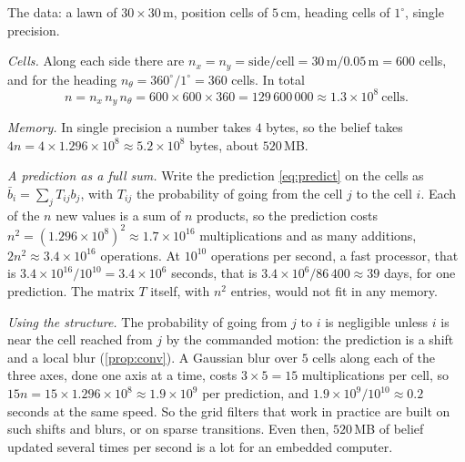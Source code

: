  The data: a lawn of $30\times30$\,m, position cells of
$5$\,cm, heading cells of $1^\circ$, single precision.

\emph{Cells.} Along each side there are
$n_x=n_y=\text{side}/\text{cell}=30\,\text{m}/0.05\,\text{m}=600$ cells,
and for the heading $n_\theta=360^\circ/1^\circ=360$ cells. In total
\[
  n=n_x\,n_y\,n_\theta=600\times600\times360=129\,600\,000
  \approx1.3\times10^8\ \text{cells}.
\]

\emph{Memory.} In single precision a number takes $4$ bytes, so the
belief takes $4n=4\times1.296\times10^8\approx5.2\times10^8$ bytes, about
$520$\,MB.

\emph{A prediction as a full sum.} Write the prediction
\eqref{eq:predict} on the cells as $\bar b_i=\sum_jT_{ij}b_j$, with
$T_{ij}$ the probability of going from the cell $j$ to the cell $i$. Each
of the $n$ new values is a sum of $n$ products, so the prediction costs
$n^2=(1.296\times10^8)^2\approx1.7\times10^{16}$ multiplications and as
many additions, $2n^2\approx3.4\times10^{16}$ operations. At $10^{10}$
operations per second, a fast processor, that is
$3.4\times10^{16}/10^{10}=3.4\times10^6$ seconds, that is
$3.4\times10^6/86\,400\approx39$ days, for one prediction. The matrix
$T$ itself, with $n^2$ entries, would not fit in any memory.

\emph{Using the structure.} The probability of going from $j$ to $i$ is
negligible unless $i$ is near the cell reached from $j$ by the commanded
motion: the prediction is a shift and a local blur (\cref{prop:conv}).
A Gaussian blur over $5$ cells along each of the three axes, done one
axis at a time, costs $3\times5=15$ multiplications per cell, so
$15n=15\times1.296\times10^8\approx1.9\times10^9$ per prediction, and
$1.9\times10^9/10^{10}\approx0.2$ seconds at the same speed. So the grid filters
that work in practice are built on such shifts and blurs, or on sparse
transitions. Even then, $520$\,MB of belief updated several times per
second is a lot for an embedded computer.


